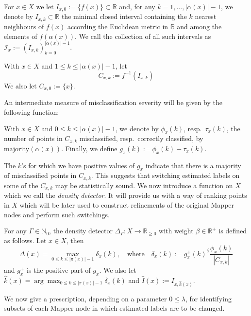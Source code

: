 For $x \in X$ we let $I_{x, 0} := \{ f(x) \} \subset \mathbb R$ and, for any $k=1, \ldots, |\alpha(x)| - 1$, we denote by $I_{x, k}\subset \mathbb R$ the minimal closed interval containing the $k$ nearest neighbours of $f(x)$ according the Euclidean metric in $\mathbb{R}$ and among the elements of $f(\alpha(x))$. We call the collection of all such intervals as $\mathcal{I}_x := (I_{x, k})_{k=0}^{|\alpha(x)|-1}$.


\begin{definition}
	With $x \in X$ and $1 \leq k \leq |\alpha(x)|-1 $, let 
	$$ C_{x,k} := f^{-1}(I_{x,k})$$
	We also let $C_{x,0}:=\{x \}$.
\end{definition}
An intermediate measure of misclassification severity will be given by the following function: 
\begin{definition}
	With $x \in X$ and $0 \leq k \leq |\alpha(x)|-1 $, we denote by $\phi_x(k)$, resp.\ $\tau_x(k)$, the number of points in $C_{x,k}$ misclassified, resp.\ correctly classified, by $\mathrm{majority}(\alpha(x))$.  Finally, we define $g_x(k):=\phi_x(k) - \tau_x(k)$.
\end{definition} 

The $k$'s for which we have positive values of $g_x$ indicate that there is a majority of misclassified points in $C_{x,k}$.  This suggests that switching estimated labels on some of the $C_{x,k}$ may be statistically sound. We now introduce a function on $X$ which we call the \emph{density detector}. It will provide us with a way of ranking points in $X$ which will be later used to construct refinements of the original Mapper nodes and perform such switchings.

\begin{definition}\label{def: delta}
	For any $\Gamma \in \mathbb{N}_0$, the density detector $\Delta_\Gamma : X \rightarrow \mathbb R_{\geq 0}$ with weight $\beta \in \mathbb R^+$ is defined as follows.  Let $x \in X$, then
	\begin{equation*}
	\Delta (x)= \max\limits_{0 \leq k \leq |\pi(x)| - 1} \delta_x(k), \quad \text{where} \quad \delta_x(k) := g_x^+(k)^{\beta} \frac{\phi_x(k)}{|C_{x,k}|}
	\end{equation*}
	and $g_x^+$ is the positive part of $g_x$.  We also let $\hat k(x) = \arg \max_{0 \leq k \leq |\pi(x)| - 1}\delta_x(k)$ and $\hat I(x) := I_{x, \hat k(x)}$.
\end{definition}


We now give a prescription, depending on a parameter $0 \leq \lambda$, for identifying subsets of each Mapper node in which estimated labels are to be changed. 

